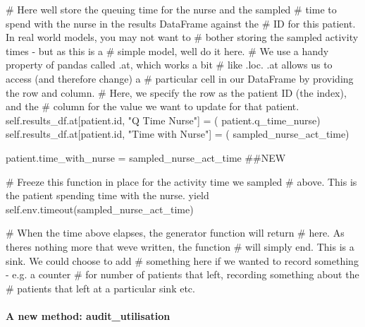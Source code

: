 \documentclass[
  letterpaper,
  DIV=11,
  numbers=noendperiod]{scrreprt}
\let\oldparagraph\paragraph
\renewcommand{\paragraph}[1]{\oldparagraph{#1}\mbox{}}
\newenvironment{Shaded}{\begin{snugshade}}{\end{snugshade}}
\newcommand{\BuiltInTok}[1]{\textcolor[rgb]{0.00,0.23,0.31}{#1}}
\newcommand{\CommentTok}[1]{\textcolor[rgb]{0.37,0.37,0.37}{#1}}
\newcommand{\ControlFlowTok}[1]{\textcolor[rgb]{0.00,0.23,0.31}{#1}}
\newcommand{\NormalTok}[1]{\textcolor[rgb]{0.00,0.23,0.31}{#1}}
\newcommand{\OperatorTok}[1]{\textcolor[rgb]{0.37,0.37,0.37}{#1}}
\newcommand{\StringTok}[1]{\textcolor[rgb]{0.13,0.47,0.30}{#1}}
\newcommand{\VariableTok}[1]{\textcolor[rgb]{0.07,0.07,0.07}{#1}}
\begin{document}
\begin{Shaded}
\begin{Highlighting}[]
        \CommentTok{\# Here we\textquotesingle{}ll store the queuing time for the nurse and the sampled}
        \CommentTok{\# time to spend with the nurse in the results DataFrame against the}
        \CommentTok{\# ID for this patient.  In real world models, you may not want to}
        \CommentTok{\# bother storing the sampled activity times {-} but as this is a}
        \CommentTok{\# simple model, we\textquotesingle{}ll do it here.}
        \CommentTok{\# We use a handy property of pandas called .at, which works a bit}
        \CommentTok{\# like .loc.  .at allows us to access (and therefore change) a}
        \CommentTok{\# particular cell in our DataFrame by providing the row and column.}
        \CommentTok{\# Here, we specify the row as the patient ID (the index), and the}
        \CommentTok{\# column for the value we want to update for that patient.}
        \VariableTok{self}\NormalTok{.results\_df.at[patient.}\BuiltInTok{id}\NormalTok{, }\StringTok{"Q Time Nurse"}\NormalTok{] }\OperatorTok{=}\NormalTok{ (}
\NormalTok{            patient.q\_time\_nurse)}
        \VariableTok{self}\NormalTok{.results\_df.at[patient.}\BuiltInTok{id}\NormalTok{, }\StringTok{"Time with Nurse"}\NormalTok{] }\OperatorTok{=}\NormalTok{ (}
\NormalTok{            sampled\_nurse\_act\_time)}

\NormalTok{        patient.time\_with\_nurse }\OperatorTok{=}\NormalTok{ sampled\_nurse\_act\_time }\CommentTok{\#\#NEW}

        \CommentTok{\# Freeze this function in place for the activity time we sampled}
        \CommentTok{\# above.  This is the patient spending time with the nurse.}
        \ControlFlowTok{yield} \VariableTok{self}\NormalTok{.env.timeout(sampled\_nurse\_act\_time)}

        \CommentTok{\# When the time above elapses, the generator function will return}
        \CommentTok{\# here.  As there\textquotesingle{}s nothing more that we\textquotesingle{}ve written, the function}
        \CommentTok{\# will simply end.  This is a sink.  We could choose to add}
        \CommentTok{\# something here if we wanted to record something {-} e.g. a counter}
        \CommentTok{\# for number of patients that left, recording something about the}
        \CommentTok{\# patients that left at a particular sink etc.}
\end{Highlighting}
\end{Shaded}

\paragraph{A new method:
audit\_utilisation}\label{a-new-method-audit_utilisation}
\end{document}
